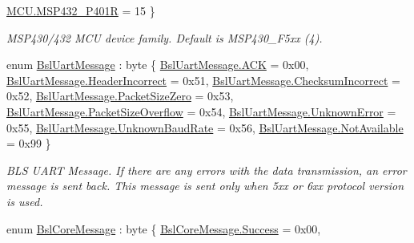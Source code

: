\begin{DoxyCompactItemize}
\mbox{\hyperlink{namespace_b_s_l430___n_e_t_a2cdaa65be7e1679fc8ca77610b19a490aced9b803d4bc56f956fa933ba49b0f59}{M\+C\+U.\+M\+S\+P432\+\_\+\+P401R}} = 15
 \}
\begin{DoxyCompactList}\small\item\em M\+S\+P430/432 M\+CU device family. Default is M\+S\+P430\+\_\+\+F5xx (4). \end{DoxyCompactList}\item 
enum \mbox{\hyperlink{namespace_b_s_l430___n_e_t_ae93ff76b832d2a9a0c3d67665e2f25ac}{Bsl\+Uart\+Message}} \+: byte \{ \newline
\mbox{\hyperlink{namespace_b_s_l430___n_e_t_ae93ff76b832d2a9a0c3d67665e2f25aca0fc437bc317835cad5faafc12a83fad5}{Bsl\+Uart\+Message.\+A\+CK}} = 0x00, 
\mbox{\hyperlink{namespace_b_s_l430___n_e_t_ae93ff76b832d2a9a0c3d67665e2f25acaab0f2d43e5f4dd050eeefec3fc0ebe18}{Bsl\+Uart\+Message.\+Header\+Incorrect}} = 0x51, 
\mbox{\hyperlink{namespace_b_s_l430___n_e_t_ae93ff76b832d2a9a0c3d67665e2f25aca9b80238295e8452348cb146627795ffb}{Bsl\+Uart\+Message.\+Checksum\+Incorrect}} = 0x52, 
\mbox{\hyperlink{namespace_b_s_l430___n_e_t_ae93ff76b832d2a9a0c3d67665e2f25aca50b3e17539fc378fd1c629bad0015b2c}{Bsl\+Uart\+Message.\+Packet\+Size\+Zero}} = 0x53, 
\newline
\mbox{\hyperlink{namespace_b_s_l430___n_e_t_ae93ff76b832d2a9a0c3d67665e2f25aca01b9aec1dc5005179c024e46a3ddd7c9}{Bsl\+Uart\+Message.\+Packet\+Size\+Overflow}} = 0x54, 
\mbox{\hyperlink{namespace_b_s_l430___n_e_t_ae93ff76b832d2a9a0c3d67665e2f25acabfaef30f1c8011c5cefa38ae470fb7aa}{Bsl\+Uart\+Message.\+Unknown\+Error}} = 0x55, 
\mbox{\hyperlink{namespace_b_s_l430___n_e_t_ae93ff76b832d2a9a0c3d67665e2f25acadc86f6793d96f97b2925c50cbaccbbdc}{Bsl\+Uart\+Message.\+Unknown\+Baud\+Rate}} = 0x56, 
\mbox{\hyperlink{namespace_b_s_l430___n_e_t_ae93ff76b832d2a9a0c3d67665e2f25aca534ceac854da4ba59c4dc41b7ab732dc}{Bsl\+Uart\+Message.\+Not\+Available}} = 0x99
 \}
\begin{DoxyCompactList}\small\item\em B\+LS U\+A\+RT Message. If there are any errors with the data transmission, an error message is sent back. This message is sent only when 5xx or 6xx protocol version is used. \end{DoxyCompactList}\item 
enum \mbox{\hyperlink{namespace_b_s_l430___n_e_t_ac916153c12b33a95ee1fd35e1a15f17a}{Bsl\+Core\+Message}} \+: byte \{ \newline
\mbox{\hyperlink{namespace_b_s_l430___n_e_t_ac916153c12b33a95ee1fd35e1a15f17aa505a83f220c02df2f85c3810cd9ceb38}{Bsl\+Core\+Message.\+Success}} = 0x00, 

\end{DoxyCompactItemize}
